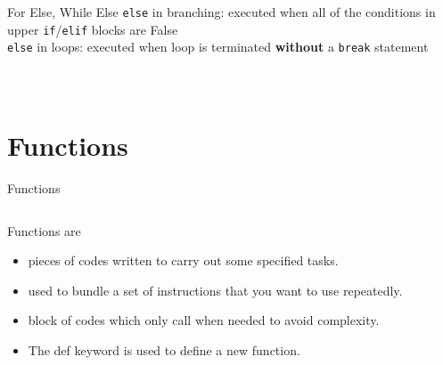         \begin{frame}{For Else, While Else}
            \texttt{else} in branching: executed when all of the conditions in upper \texttt{if}/\texttt{elif} blocks are False\\
            \texttt{else} in loops: executed when loop is terminated \textbf{without} a \texttt{break} statement
            \vspace{-3mm}
            \begin{columns}
                \begin{column}{0.52\textwidth}
                    \inputminted[frame=single,framesep=2pt]{python3}{../Review1/code-examples/while_else.py}
                \end{column}
                \begin{column}{0.48\textwidth}
                    \inputminted[frame=single,framesep=2pt]{python3}{../Review1/code-examples/for_else.py}
                \end{column}
            \end{columns}
        \end{frame}

    \section{Functions}
        \begin{frame}{Functions}
            \begin{columns}
                \begin{column}{0.50\textwidth}
                    Functions are
                    \begin{itemize}
                        \item pieces of codes written to carry out some specified tasks.
                        \item used to bundle a set of instructions that you want to use repeatedly.
                        \item block of codes which only call when needed to avoid complexity.
                        \newline
                        \item The def keyword is used to define a new function.
                    \end{itemize}
                \end{column}
                \begin{column}{0.50\textwidth}
                    \inputminted[frame=single,framesep=2pt, lastline=8]{python3}{code-examples/function_def.py}
                    \inputminted[frame=single,framesep=2pt, lastline=8]{python3}{code-examples/function_def2.py}
                    \inputminted[frame=single,framesep=2pt, lastline=8]{python3}{code-examples/function_def3.py}
                \end{column}
            \end{columns}
        \end{frame}   
            


